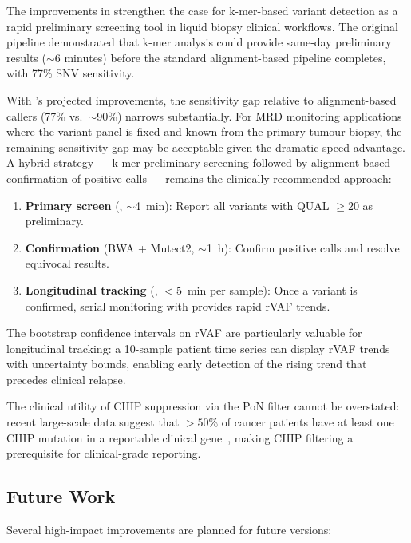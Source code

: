 The improvements in \kmerdet{} strengthen the case for k-mer-based variant
detection as a rapid preliminary screening tool in liquid biopsy clinical
workflows.  The original \kam{} pipeline demonstrated that k-mer analysis
could provide same-day preliminary results ($\sim$6 minutes) before the
standard alignment-based pipeline completes, with 77\% SNV sensitivity.

With \kmerdet{}'s projected improvements, the sensitivity gap relative to
alignment-based callers (77\% vs.\ $\sim$90\%) narrows substantially.  For MRD
monitoring applications where the variant panel is fixed and known from the
primary tumour biopsy, the remaining sensitivity gap may be acceptable given
the dramatic speed advantage.  A hybrid strategy --- k-mer preliminary
screening followed by alignment-based confirmation of positive calls --- remains
the clinically recommended approach:

\begin{enumerate}
  \item \textbf{Primary screen} (\kmerdet{}, $\sim$4~min): Report all variants
    with QUAL $\geq 20$ as preliminary.
  \item \textbf{Confirmation} (BWA + Mutect2, $\sim$1~h): Confirm positive calls
    and resolve equivocal results.
  \item \textbf{Longitudinal tracking} (\kmerdet{}, $<5$~min per sample):
    Once a variant is confirmed, serial monitoring with \kmerdet{} provides
    rapid rVAF trends.
\end{enumerate}

The bootstrap confidence intervals on rVAF are particularly valuable for
longitudinal tracking: a 10-sample patient time series can display rVAF trends
with uncertainty bounds, enabling early detection of the rising trend that
precedes clinical relapse.

The clinical utility of CHIP suppression via the PoN filter cannot be
overstated: recent large-scale data suggest that $>50\%$ of cancer patients
have at least one CHIP mutation in a reportable clinical gene~\cite{blasco2015chip},
making CHIP filtering a prerequisite for clinical-grade reporting.

\subsection{Future Work}
\label{sec:discussion-future}

Several high-impact improvements are planned for future \kmerdet{} versions:

